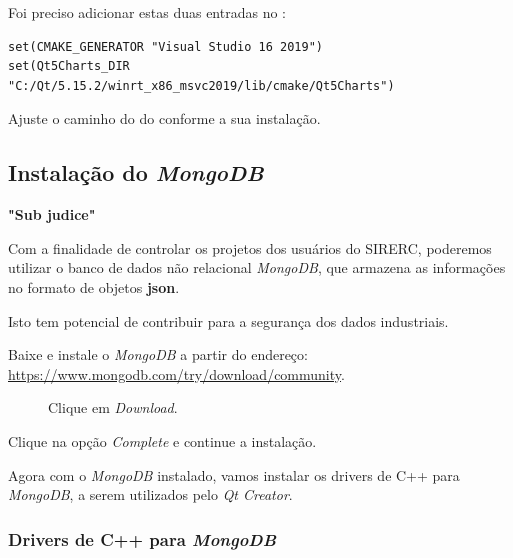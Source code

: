 \documentclass[a4paper,11pt]{article}
\newcommand{\sistema}{\textsf{SIRERC}}
\newcommand{\qtcreator}{\textit{Qt Creator}}
\newcommand{\download}{\textit{Download}}
\newcommand{\mongo}{\textit{MongoDB}}
\newcommand{\cautionbox}[1]{
	\vskip 5mm
	\begin{leftbar}
		\textbf{#1}
	\end{leftbar}
	\vskip 5mm
}
\begin{document}
Foi preciso adicionar estas duas entradas no :

\begin{mdframed}
	\begin{verbatim}
set(CMAKE_GENERATOR "Visual Studio 16 2019")
set(Qt5Charts_DIR "C:/Qt/5.15.2/winrt_x86_msvc2019/lib/cmake/Qt5Charts")
	\end{verbatim}
\end{mdframed}

Ajuste o caminho do  do  conforme a sua instalação.


\subsection{Instalação do \mongo{}}

\cautionbox{\color{red}"Sub judice"}

\color{brown}

Com a finalidade de controlar os projetos dos usuários do \sistema{}, poderemos utilizar o banco de dados não relacional \mongo{}, que armazena as informações no formato de objetos \textbf{json}.

Isto tem potencial de contribuir para a segurança dos dados industriais.

Baixe e instale o \mongo{} a partir do endereço: \url{https://www.mongodb.com/try/download/community}.

\begin{figure}[H]
	\centering
	\caption{Clique em \download{}.}\label{fig:mongodb_download_2}
\end{figure}

Clique na opção \textit{Complete} e continue a instalação.

Agora com o \mongo{} instalado, vamos instalar os drivers de C++ para \mongo{}, a serem utilizados pelo \qtcreator{}.


\subsubsection{Drivers de C++ para \mongo{}}
\end{document}
